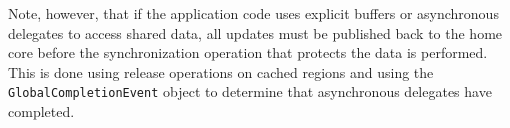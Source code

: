 Note, however, that if the application code uses explicit buffers or
asynchronous delegates to access shared data, all updates must be published back to
the home core before the synchronization operation that protects the data is
performed. This is done using release operations on cached regions and using
the \texttt{GlobalCompletionEvent} object to determine that asynchronous
delegates have completed.





